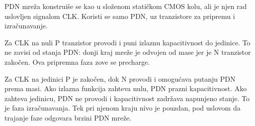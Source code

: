 PDN mreža konstruiše se kao u složenom statičkom CMOS kolu, ali je njen rad uslovljen signalom CLK. Koristi se samo PDN, uz tranzistore za pripremu i izračunavanje.

Za CLK na nuli P tranzistor provodi i puni izlaznu kapacitivnost do jedinice. To ne zavisi od stanja PDN: donji kraj mreže je odvojen od mase jer je N tranzistor zakočen. Ova pripremna faza zove se precharge.

Za CLK na jedinici P je zakočen, dok N provodi i omogućava putanju PDN prema masi. Ako izlazna funkcija zahteva nulu, PDN prazni kapacitivnost. Ako zahteva jedinicu, PDN ne provodi i kapacitivnost zadržava napunjeno stanje. To je faza izračunavanja. Tek pri njenom kraju nivo je pouzdan, pod uslovom da trajanje faze odgovara brzini PDN mreže.
